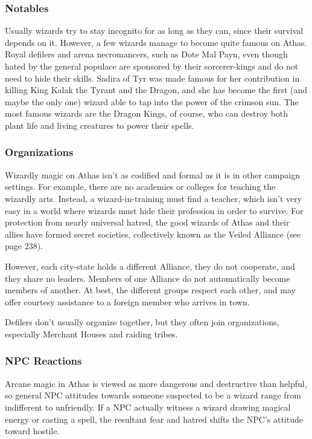 \subsubsection{Notables}
Usually wizards try to stay incognito for as long as they can, since their survival depends on it. However, a few wizards manage to become quite famous on Athas. Royal defilers and arena necromancers, such as Dote Mal Payn, even though hated by the general populace are sponsored by their sorcerer-kings and do not need to hide their skills. Sadira of Tyr was made famous for her contribution in killing King Kalak the Tyrant and the Dragon, and she has become the first (and maybe the only one) wizard able to tap into the power of the crimson sun. The most famous wizards are the Dragon Kings, of course, who can destroy both plant life and living creatures to power their spells.

\subsubsection{Organizations}
Wizardly magic on Athas isn't as codified and formal as it is in other campaign settings. For example, there are no academies or colleges for teaching the wizardly arts. Instead, a wizard-in-training must find a teacher, which isn't very easy in a world where wizards must hide their profession in order to survive. For protection from nearly universal hatred, the good wizards of Athas and their allies have formed secret societies, collectively known as the Veiled Alliance (see page 238).

However, each city-state holds a different Alliance, they do not cooperate, and they share no leaders. Members of one Alliance do not automatically become members of another. At best, the different groups respect each other, and may offer courtesy assistance to a foreign member who arrives in town.

Defilers don't usually organize together, but they often join organizations, especially Merchant Houses and raiding tribes.

\subsubsection{NPC Reactions}
Arcane magic in Athas is viewed as more dangerous and destructive than helpful, so general NPC attitudes towards someone suspected to be a wizard range from indifferent to unfriendly. If a NPC actually witness a wizard drawing magical energy or casting a spell, the resultant fear and hatred shifts the NPC's attitude toward hostile.

